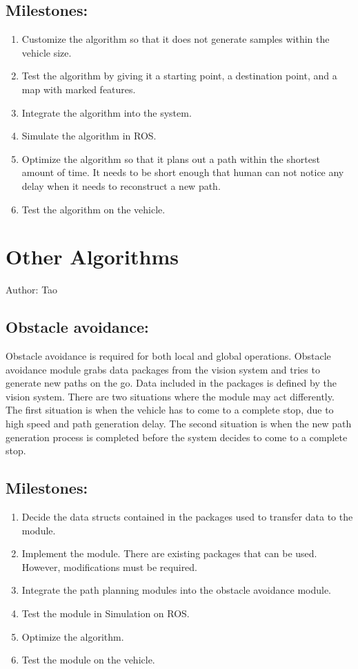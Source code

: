 \documentclass[compsoc,draftclsnofoot,onecolumn,10pt]{IEEEtran}
\begin{document}
\subsection{Milestones:}
\begin{enumerate}
	\item Customize the algorithm so that it does not generate samples within the vehicle size.
	\item Test the algorithm by giving it a starting point, a destination point, and a map with marked features.
	\item Integrate the algorithm into the system.  
	\item Simulate the algorithm in ROS.
	\item Optimize the algorithm so that it plans out a path within the shortest amount of time. It needs to be short enough that human can not notice any delay when it needs to reconstruct a new path.
	\item Test the algorithm on the vehicle.
\end{enumerate}

\section{Other Algorithms}
Author: Tao \par
\subsection{Obstacle avoidance:}
Obstacle avoidance is required for both local and global operations. Obstacle avoidance module grabs data packages from the vision system and tries to generate new paths on the go. Data included in the packages is defined by the vision system. There are two situations where the module may act differently. The first situation is when the vehicle has to come to a complete stop, due to high speed and path generation delay. The second situation is when the new path generation process is completed before the system decides to come to a complete stop.\par
\subsection{Milestones:}
\begin{enumerate}
	\item Decide the data structs contained in the packages used to transfer data to the module.
	\item Implement the module. There are existing packages that can be used. However, modifications must be required.
	\item Integrate the path planning modules into the obstacle avoidance module.
	\item Test the module in Simulation on ROS.
	\item Optimize the algorithm.
	\item Test the module on the vehicle.
\end{enumerate}
\end{document}
